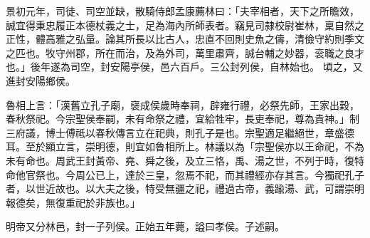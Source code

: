 \begin{pinyinscope}
 
景初元年，司徒、司空並缺，散騎侍郎孟康薦林曰：「夫宰相者，天下之所瞻效，誠宜得秉忠履正本德杖義之士，足為海內所師表者。竊見司隷校尉崔林，稟自然之正性，體高雅之弘量。論其所長以比古人，忠直不回則史魚之儔，清儉守約則季文之匹也。牧守州郡，所在而治，及為外司，萬里肅齊，誠台輔之妙器，衮職之良才也。」後年遂為司空，封安陽亭侯，邑六百戶。三公封列侯，自林始也。
 頃之，又進封安陽鄉侯。
 
 
魯相上言：「漢舊立孔子廟，襃成侯歲時奉祠，辟雍行禮，必祭先師，王家出穀，春秋祭祀。今宗聖侯奉嗣，未有命祭之禮，宜給牲牢，長吏奉祀，尊為貴神。」制三府議，博士傅祗以春秋傳言立在祀典，則孔子是也。宗聖適足繼絕世，章盛德耳。至於顯立言，崇明德，則宜如魯相所上。林議以為「宗聖侯亦以王命祀，不為未有命也。周武王封黃帝、堯、舜之後，及立三恪，禹、湯之世，不列于時，復特命他官祭也。今周公已上，達於三皇，忽焉不祀，而其禮經亦存其言。今獨祀孔子者，以世近故也。以大夫之後，特受無疆之祀，禮過古帝，義踰湯、武，可謂崇明報德矣，無復重祀於非族也。」
 
 
明帝又分林邑，封一子列侯。正始五年薨，謚曰孝侯。子述嗣。
 
 
\end{pinyinscope}